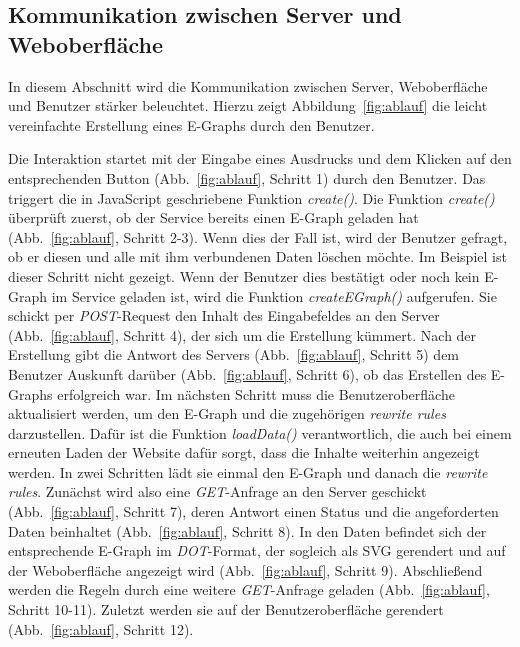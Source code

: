 \subsection{Kommunikation zwischen Server und Weboberfläche}


In diesem Abschnitt wird die Kommunikation zwischen Server, Weboberfläche und Benutzer stärker beleuchtet.
Hierzu zeigt Abbildung~\ref{fig:ablauf} die leicht vereinfachte Erstellung eines E-Graphs durch den Benutzer.


Die Interaktion startet mit der Eingabe eines Ausdrucks und dem Klicken auf den entsprechenden Button (Abb.~\ref{fig:ablauf}, Schritt 1) durch den Benutzer.
Das triggert die in JavaScript geschriebene Funktion \textit{create()}. 
Die Funktion \textit{create()} überprüft zuerst, ob der Service bereits einen E-Graph geladen hat (Abb.~\ref{fig:ablauf}, Schritt 2-3). Wenn dies der Fall ist, wird der Benutzer
gefragt, ob er diesen und alle mit ihm verbundenen Daten löschen möchte. Im Beispiel ist dieser Schritt nicht gezeigt.
Wenn der Benutzer dies bestätigt oder noch kein E-Graph im Service geladen ist, wird die Funktion \textit{createEGraph()} aufgerufen. 
Sie schickt per \textit{POST}-Request den Inhalt des Eingabefeldes an den Server (Abb.~\ref{fig:ablauf}, Schritt 4), der sich um die Erstellung kümmert.
Nach der Erstellung gibt die Antwort des Servers (Abb.~\ref{fig:ablauf}, Schritt 5) dem Benutzer Auskunft darüber (Abb.~\ref{fig:ablauf}, Schritt 6), ob das Erstellen des E-Graphs erfolgreich war.
Im nächsten Schritt muss die Benutzeroberfläche aktualisiert werden, um den E-Graph und die zugehörigen \textit{rewrite rules} darzustellen.
Dafür ist die Funktion \textit{loadData()} verantwortlich, die auch bei einem erneuten Laden der Website dafür sorgt, dass die Inhalte weiterhin angezeigt werden.
In zwei Schritten lädt sie einmal den E-Graph und danach die \textit{rewrite rules}.
Zunächst wird also eine \textit{GET}-Anfrage an den Server geschickt (Abb.~\ref{fig:ablauf}, Schritt 7), deren Antwort einen Status und die angeforderten Daten beinhaltet (Abb.~\ref{fig:ablauf}, Schritt 8).
In den Daten befindet sich der entsprechende E-Graph im \textit{DOT}-Format, der sogleich als SVG gerendert und auf 
der Weboberfläche angezeigt wird (Abb.~\ref{fig:ablauf}, Schritt 9).
Abschließend werden die Regeln durch eine weitere \textit{GET}-Anfrage geladen (Abb.~\ref{fig:ablauf}, Schritt 10-11). Zuletzt werden sie auf der Benutzeroberfläche gerendert (Abb.~\ref{fig:ablauf}, Schritt 12).

